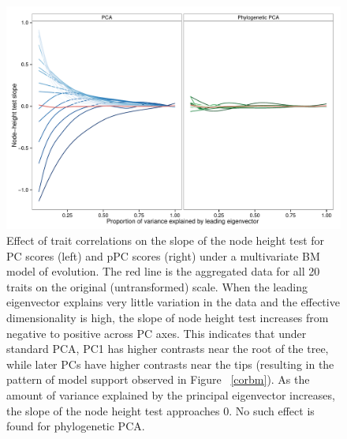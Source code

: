 \documentclass[a4paper,12pt]{article}
\begin{document}
\begin{figure}[p]
\centering
\includegraphics[scale=0.65]{./fig/onion.pdf}
\caption{Effect of trait correlations on the slope of the node height test for PC scores (left) and pPC scores (right) under a multivariate BM model of evolution. The red line is the aggregated data for all 20 traits on the original (untransformed) scale. When the leading eigenvector explains very little variation in the data and the effective dimensionality is high, the slope of node height test increases from negative to positive across PC axes. This indicates that under standard PCA, PC1 has higher contrasts near the root of the tree, while later PCs have higher contrasts near the tips (resulting in the pattern of model support observed in Figure ~\ref{corbm}). As the amount of variance explained by the principal eigenvector increases, the slope of the node height test approaches 0. No such effect is found for phylogenetic PCA.}
\label{rank}
\end{figure}
\end{document}
